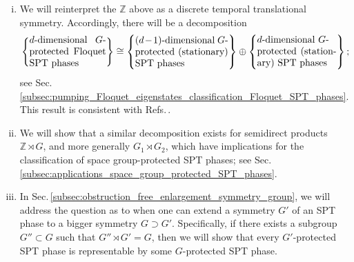 \documentclass[sort&compress]{elsarticle}
\theoremstyle{theoremstyle}
\theoremstyle{framedtheoremstyle}
\theoremstyle{definitionstyle}
\theoremstyle{definitionstyle}
\theoremstyle{definitionstyle}
\theoremstyle{definitionstyle}
\theoremstyle{nameddefinitionstyle}
\theoremstyle{framednameddefinitionstyle}
\theoremstyle{proofstyle}
\theoremstyle{definitionstyle}
\newcommand{\ZZZ}{\mathbb{Z}}
\newcommand{\isomorphic}{\cong}
\newcommand{\braces}[1]{\left\{ #1 \right\}}
\begin{document}
\begin{enumerate}[(i)]
\item We will reinterpret the $\ZZZ$ above as a discrete temporal translational symmetry. Accordingly, there will be a decomposition
\begin{eqnarray}
\braces{\parbox{2.8cm}{$d$-dimensional $G$-protected Floquet SPT phases}}
\isomorphic
\braces{\parbox{3.4cm}{$(d-1)$-dimensional $G$-\par protected (stationary) SPT phases}}
\oplus
\braces{\parbox{2.9cm}{$d$-dimensional $G$-\par protected (stationary) SPT phases}};
\end{eqnarray}
see Sec.\,\ref{subsec:pumping_Floquet_eigenstates_classification_Floquet_SPT_phases}. This result is consistent with Refs.\,\cite{Keyserlingk_Floquet, Else_Floquet, Potter_Floquet}.

\item We will show that a similar decomposition exists for semidirect products $\ZZZ \rtimes G$, and more generally $G_1 \rtimes G_2$, which have implications for the classification of space group-protected SPT phases; see Sec.\,\ref{subsec:applications_space_group_protected_SPT_phases}.

\item %
In Sec.\,\ref{subsec:obstruction_free_enlargement_symmetry_group}, we will address the question as to when one can extend a symmetry $G'$ of an SPT phase to a bigger symmetry $G \supset G'$. 
Specifically, if there exists a subgroup $G''\subset G$ such that $G'' \rtimes G' = G$,
then we will show that every $G'$-protected SPT phase is representable by some $G$-protected SPT phase.


\end{enumerate}
\end{document}
